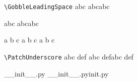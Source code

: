\documentclass{article}
\newcommand\AssertPatch[3]{%
	\def\tmpIs{#2}%
	\def\tmpExpected{#3}%
	#1\tmpIs
	\ifx\tmpIs\tmpExpected
		\success
	\else
		\fail
		\PackageError{test}{"\tmpIs" != "\tmpExpected"}{}%
	\fi
	\ignorespaces
}
\begin{document}
	\verb|\GobbleLeadingSpace|
	\AssertPatch\GobbleLeadingSpaceIn{abc}{abc}
	\AssertPatch\GobbleLeadingSpaceIn{ abc}{abc}
	\AssertPatch\GobbleLeadingSpaceIn{ a b c }{a b c }

	\verb|\PatchUnderscore|
	\AssertPatch\PatchUnderscore{abc def}{abc def}
	\AssertPatch\PatchUnderscore{__init__.py}{\textunderscore\textunderscore init\textunderscore\textunderscore.py}
\end{document}
